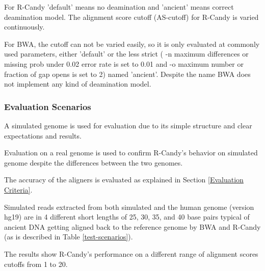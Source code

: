 \documentclass[11pt,a4paper]{report}
\begin{document}
For R-Candy 'default' means no deamination and 'ancient' means correct 
deamination model. The alignment score cutoff (AS-cutoff) for R-Candy is varied 
continuously.

For BWA, the cutoff can not be varied easily, so it is only evaluated at 
commonly used parameters, either 'default' or the less strict ( -n maximum 
differences or missing prob under 0.02 error rate is set to 0.01 and -o maximum
number or fraction of gap opens is set to 2) named 'ancient'. Despite the name 
BWA does not implement any kind of deamination model.





\subsubsection*{Evaluation Scenarios} \label{Evaluation Scenarios}

A simulated genome is used for evaluation due to its simple structure 
and clear expectations and results. 

Evaluation on a real genome is used to confirm R-Candy's behavior 
on simulated genome despite the differences between the two genomes.

The accuracy of the aligners is evaluated as explained in Section
 \ref{Evaluation Criteria}.

Simulated reads extracted from both simulated and the human genome
(version hg19) are in 4 different short lengths of 25, 30, 35, and 
40 base pairs typical of ancient DNA getting aligned back to the 
reference genome by BWA and R-Candy (as is described in Table 
\ref{test-scenarios}).

The results show R-Candy's performance on a different range of 
alignment scores cutoffs from 1 to 20.
\end{document}
